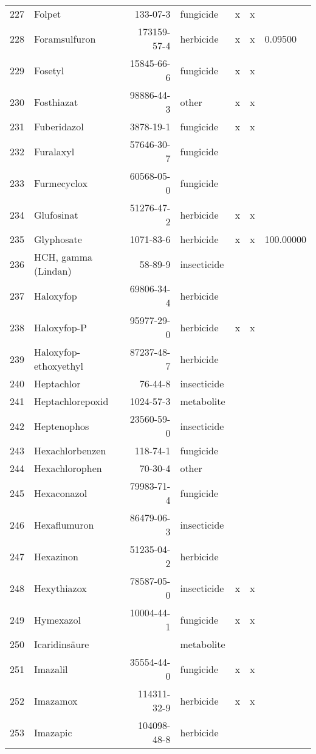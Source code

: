 \begin{longtable}{lp{4cm}rlp{1.3cm}p{1.3cm}p{1.5cm}}
  227 & Folpet & 133-07-3 & fungicide & x & x &  \\ 
  228 & Foramsulfuron & 173159-57-4 & herbicide & x & x & 0.09500 \\ 
  229 & Fosetyl & 15845-66-6 & fungicide & x & x &  \\ 
  230 & Fosthiazat & 98886-44-3 & other & x & x &  \\ 
  231 & Fuberidazol & 3878-19-1 & fungicide & x & x &  \\ 
  232 & Furalaxyl & 57646-30-7 & fungicide &  &  &  \\ 
  233 & Furmecyclox & 60568-05-0 & fungicide &  &  &  \\ 
  234 & Glufosinat & 51276-47-2 & herbicide & x & x &  \\ 
  235 & Glyphosate & 1071-83-6 & herbicide & x & x & 100.00000 \\ 
  236 & HCH, gamma (Lindan) & 58-89-9 & insecticide &  &  &  \\ 
  237 & Haloxyfop & 69806-34-4 & herbicide &  &  &  \\ 
  238 & Haloxyfop-P & 95977-29-0 & herbicide & x & x &  \\ 
  239 & Haloxyfop-ethoxyethyl & 87237-48-7 & herbicide &  &  &  \\ 
  240 & Heptachlor & 76-44-8 & insecticide &  &  &  \\ 
  241 & Heptachlorepoxid & 1024-57-3 & metabolite &  &  &  \\ 
  242 & Heptenophos & 23560-59-0 & insecticide &  &  &  \\ 
  243 & Hexachlorbenzen & 118-74-1 & fungicide &  &  &  \\ 
  244 & Hexachlorophen & 70-30-4 & other &  &  &  \\ 
  245 & Hexaconazol & 79983-71-4 & fungicide &  &  &  \\ 
  246 & Hexaflumuron & 86479-06-3 & insecticide &  &  &  \\ 
  247 & Hexazinon & 51235-04-2 & herbicide &  &  &  \\ 
  248 & Hexythiazox & 78587-05-0 & insecticide & x & x &  \\ 
  249 & Hymexazol & 10004-44-1 & fungicide & x & x &  \\ 
  250 & Icaridinsäure &  & metabolite &  &  &  \\ 
  251 & Imazalil & 35554-44-0 & fungicide & x & x &  \\ 
  252 & Imazamox & 114311-32-9 & herbicide & x & x &  \\ 
  253 & Imazapic & 104098-48-8 & herbicide &  &  &  \\ 

\end{longtable}
